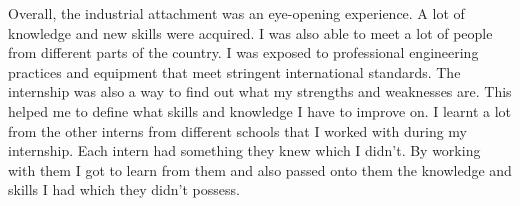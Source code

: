 Overall, the industrial attachment was an eye-opening experience. A lot of knowledge
and new skills were acquired. I was also able to meet a lot of people from different
parts of the country. I was exposed to professional engineering practices and
equipment that meet stringent international standards.
The internship was also a way to find out what my strengths and weaknesses are. This
helped me to define what skills and knowledge I have to improve on.
I learnt a lot from the other interns from different schools that I worked with during
my internship. Each intern had something they knew which I didn't. By working with
them I got to learn from them and also passed onto them the knowledge and skills I
had which they didn’t possess.